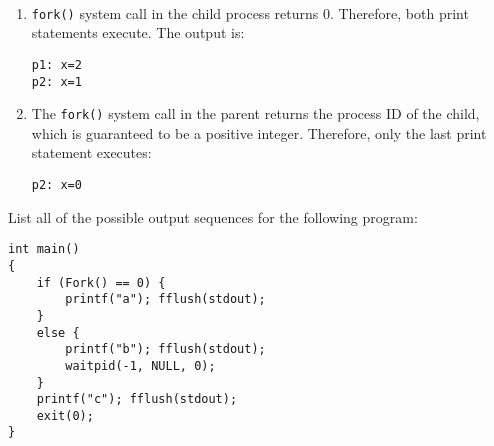 \documentclass[12pt]{article}
\newenvironment{ex}[2][Exercise]{\begin{trivlist}
		\item[\hskip \labelsep {\bfseries #1}\hskip \labelsep {\bfseries #2.}]}{\end{trivlist}}
\newenvironment{sol}[1][Solution]{\begin{trivlist}
		\item[\hskip \labelsep {\bfseries #1:}]}{\end{trivlist}}
\begin{document}
\begin{sol}
	\
	\begin{enumerate}[label=(\alph*)]
		\item \texttt{fork()} system call in the child process returns 0. Therefore, both print
		statements execute. The output is:
		\begin{lstlisting}[language=={}]
p1: x=2
p2: x=1
		\end{lstlisting}
		\item The \texttt{fork()} system call in the parent returns the process ID of the child,
		which is guaranteed to be a positive integer. Therefore, only the last print statement
		executes:
		\begin{lstlisting}[language={}]
p2: x=0
		\end{lstlisting}
	\end{enumerate}
\end{sol}

\begin{ex}{8.3}
	List all of the possible output sequences for the following program:
	\begin{lstlisting}
int main()
{
	if (Fork() == 0) {
		printf("a"); fflush(stdout);
	}
	else {
		printf("b"); fflush(stdout);
		waitpid(-1, NULL, 0);
	}
	printf("c"); fflush(stdout);
	exit(0);
}
	\end{lstlisting}
\end{ex}
\end{document}
